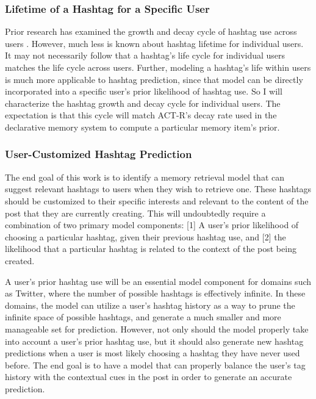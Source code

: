 \documentclass[man,floatsintext,donotrepeattitle]{apa6}
\begin{document}
\subsubsection{Lifetime of a Hashtag for a Specific User}

Prior research has examined the growth and decay cycle of hashtag use across users \parencite{Tsur2012}.
However, much less is known about hashtag lifetime for individual users.
It may not necessarily follow that a hashtag's life cycle for individual users matches the life cycle across users.
Further, modeling a hashtag's life within users is much more applicable to hashtag prediction, since that model can be directly incorporated into a specific user's prior likelihood of hashtag use.
So I will characterize the hashtag growth and decay cycle for individual users.
The expectation is that this cycle will match ACT-R's decay rate used in the declarative memory system to compute a particular memory item's prior.

\subsubsection{User-Customized Hashtag Prediction}

The end goal of this work is to identify a memory retrieval model that can suggest relevant hashtags to users when they wish to retrieve one.
These hashtags should be customized to their specific interests and relevant to the content of the post that they are currently creating.
This will undoubtedly require a combination of two primary model components:
[1] A user's prior likelihood of choosing a particular hashtag, given their previous hashtag use, and [2] the likelihood that a particular hashtag is related to the context of the post being created. 

A user's prior hashtag use will be an essential model component for domains such as Twitter, where the number of possible hashtags is effectively infinite.
In these domains, the model can utilize a user's hashtag history as a way to prune the infinite space of possible hashtags, and generate a much smaller and more manageable set for prediction.
However, not only should the model properly take into account a user's prior hashtag use, but it should also generate new hashtag predictions when a user is most likely choosing a hashtag they have never used before.
The end goal is to have a model that can properly balance the user's tag history with the contextual cues in the post in order to generate an accurate prediction.
\end{document}
